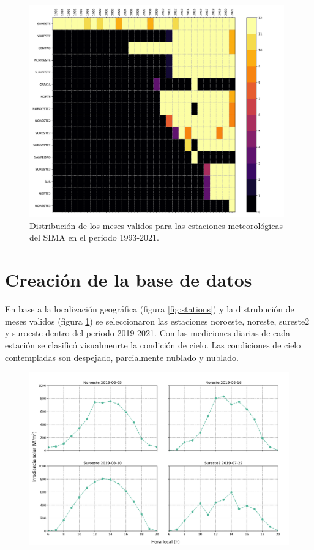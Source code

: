 \begin{figure}[H]
	\centering
	\includegraphics[width=11cm]{Graphics/Distribution_stations.png}
	\caption{Distribución de los meses validos para las estaciones meteorológicas del SIMA en el periodo 1993-2021.}
	\label{fig:distribution_data}
\end{figure}

\section{Creación de la base de datos}

En base a la localización geográfica (figura \ref{fig:stations}) y la distrubución de meses validos (figura \ref{fig:distribution_data}) se seleccionaron las estaciones noroeste, noreste, sureste2 y suroeste dentro del periodo 2019-2021. Con las mediciones diarias de cada estación se clasificó visualmenrte la condición de cielo. Las condiciones de cielo contempladas son despejado, parcialmente nublado y nublado.

\begin{figure}[H]
	\centering
	\includegraphics[width=15cm]{Graphics/example_sky_conditions.png}
	\caption{}
	\label{fig:example_sky_conditions}
\end{figure}

